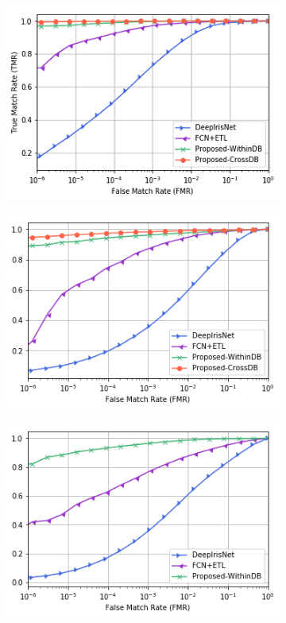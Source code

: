 \begin{figure}[!h]
	\begin{subfigure}{.33\textwidth}
		\centering
		\includegraphics[width=\columnwidth]{pictures/roc-s2.png}
		\caption{}
		\label{fig:roc-s2}
	\end{subfigure}%
	\begin{subfigure}{.33\textwidth}
		\centering
		\includegraphics[width=\columnwidth]{pictures/roc-s3.png}
		\caption{}
		\label{fig:roc-s3epochs}
	\end{subfigure}%
	\begin{subfigure}{.33\textwidth}
		\centering
		\includegraphics[width=\columnwidth]{pictures/roc-extreme.png}

\end{subfigure}
\end{figure}
